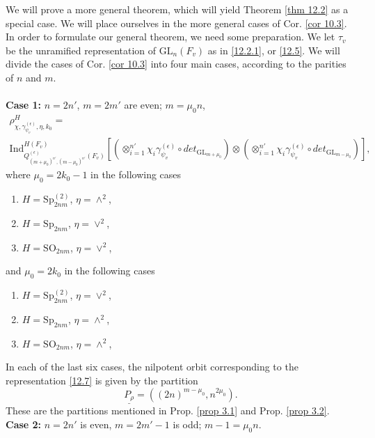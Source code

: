\documentclass[12pts]{amsart}
\newcommand{\GL}{{\mathrm{GL}}}
\newcommand{\Ind}{{\mathrm{Ind}}}
\newcommand{\SO}{{\mathrm{SO}}}
\newcommand{\Sp}{{\mathrm{Sp}}}
\begin{document}
We will prove a more general theorem, which will yield Theorem \ref{thm 12.2} as a special case. We will place ourselves in the more general cases of Cor. \ref{cor 10.3}. In order to formulate our general theorem, we need some preparation. We let $\tau_v$ be the unramified representation of $\GL_n(F_v)$ as in \eqref{12.2.1}, or \eqref{12.5}. We will divide the cases of Cor. \ref{cor 10.3} into four main cases, according to the parities of $n$ and $m$.\\
\\
{\bf Case 1:} $n=2n'$, $m=2m'$ are even; $m=\mu_0n$,
\begin{multline}\label{12.7}
\rho^H_{\chi,\gamma_{\psi_v}^{(\epsilon)},\eta,k_0}=\\
\Ind^{H(F_v)}_{Q^{(\epsilon)}_{(m+\mu_0)^{n'},(m-\mu_0)^{n'}}(F_v)}[(\otimes_{i=1}^{n'}\chi_i\gamma_{\psi_v}^{(\epsilon)}\circ det_{\GL_{m+\mu_0}}) \otimes (\otimes_{i=1}^{n'}\chi_i\gamma_{\psi_v}^{(\epsilon)}\circ det_{\GL_{m-\mu_0}})],
\end{multline}
where $\mu_0=2k_0-1$ in the following cases
\begin{enumerate}
	\item $H=\Sp_{2nm}^{(2)}$, $\eta=\wedge^2$,
	\item $H=\Sp_{2nm}$, $\eta=\vee^2$,
	\item $H=\SO_{2nm}$, $\eta=\vee^2$,
\end{enumerate}
and $\mu_0=2k_0$ in the following cases
\begin{enumerate}
	\item $H=\Sp_{2nm}^{(2)}$, $\eta=\vee^2$,
	\item $H=\Sp_{2nm}$, $\eta=\wedge^2$,
	\item $H=\SO_{2nm}$, $\eta=\wedge^2$,
\end{enumerate}
In each of the last six cases, the nilpotent orbit corresponding to the representation \eqref{12.7} is given by the partition
\begin{equation}\label{12.8}
\underline{P_\rho}=((2n)^{m-\mu_0},n^{2\mu_0}).
\end{equation}
These are the partitions mentioned in Prop. \ref{prop 3.1} and Prop. \ref{prop 3.2}.\\
{\bf Case 2:} $n=2n'$ is even, $m=2m'-1$ is odd; $m-1=\mu_0n$.
\end{document}

